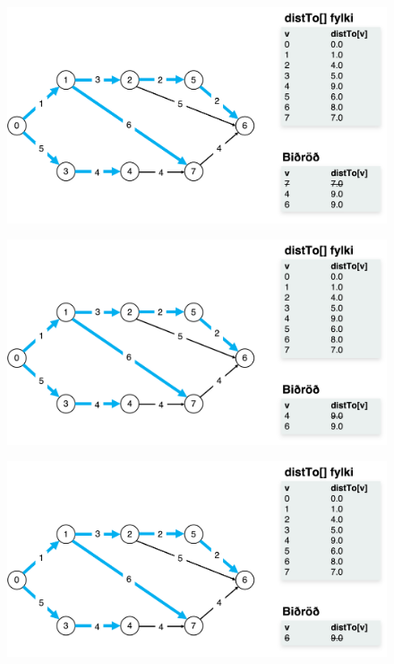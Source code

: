 \documentclass[12pt, a4paper, hidelinks]{article}
\begin{document}
\begin{figure}[H]
    \centering
    \includegraphics[width=\textwidth]{HD11/pdf/img/dijkstra/im7.png}
    \label{fig:dijkstra7}
\end{figure}


\begin{figure}[H]
    \centering
    \includegraphics[width=\textwidth]{HD11/pdf/img/dijkstra/im8.png}
    \label{fig:dijkstra8}
\end{figure}

\begin{figure}[H]
    \centering
    \includegraphics[width=\textwidth]{HD11/pdf/img/dijkstra/im9.png}
    \label{fig:dijkstra9}
\end{figure}
\end{document}
